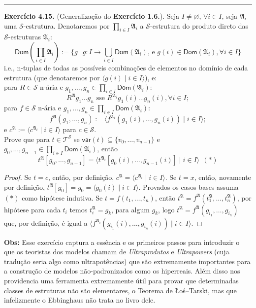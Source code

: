 \documentclass[11pt]{article}
\newcommand{\mc}[1]{\mathcal{#1}}
\newcommand{\mf}[1]{\mathfrak{#1}}
\newcommand{\msf}[1]{\mathsf{#1}}
\begin{document}
\hrule

\begin{shaded}
\textbf{Exercício 4.15.} (Generalização do \textbf{Exercício 1.6.}). Seja $I\ne\varnothing$, $\forall i\in I$, seja $\mf{A}_i$ uma $\mc{S}$-estrutura. Denotaremos por $\prod_{i\in I}\mf{A}_i$ a $\mc{S}$-estrutura do produto direto das $\mc{S}$-estruturas $\mf{A}_i$:
$$\msf{Dom}\left(\prod_{i\in I}\mf{A}_i\right):=\left.\biggl\{g~\right|~ g:I\to\bigcup_{i\in I}\msf{Dom}(\mf{A}_i)\text{, e }g(i)\in\msf{Dom}(\mf{A}_i),\forall i\in I\biggr\}$$
i.e., n-tuplas de todas as possíveis combinações de elementos no domínio de cada estrutura (que denotaremos por $\langle g(i) \mid i \in I\rangle$), e:\\
para $R\in\mc{S}$ n-ária e $g_1,\dots,g_n\in\prod_{i\in I}\msf{Dom}(\mf{A}_i):$
$$R^\mf{A}g_1\dots g_n\text{ sse }R^{\mf{A}_i}g_1(i)\dots g_n(i), \forall i\in I;$$
para $f\in\mc{S}$ n-ária e $g_1,\dots,g_n\in\prod_{i\in I}\msf{Dom}(\mf{A}_i):$
$$f^\mf{A}(g_1,\dots,g_n):=\langle f^{\mf{A}_i}(g_1(i),\dots,g_n(i)) \mid i\in I\rangle;$$
e $c^\mf{A}:=\langle c^{\mf{A}_i}\mid i\in I\rangle$ para $c\in\mc{S}$.\\
Prove que para $t\in\mc{T}^\mc{S}$ se $\msf{var}(t)\subseteq\{v_0,\dots,v_{n-1}\}$ e $g_0,\dots,g_{n-1}\in\prod_{i\in I}\msf{Dom}(\mf{A}_i)$, então
$$t^\mf{A}[g_0,\dots,g_{n-1}]=\langle t^{\mf{A}_i}[g_0(i),\dots,g_{n-1}(i)]\mid i\in I\rangle~~(*)$$
\end{shaded}

\begin{proof}
    Se $t=c$, então, por definição, $c^\mf{A}=\langle c^{\mf{A}_i}\mid i\in I\rangle$. Se $t=x$, então, novamente por definição, $t^\mf{A}[g_0]=g_0=\langle g_0(i)\mid i\in I\rangle$. Provados os casos bases assuma $(*)$ como hipótese indutiva. Se $t=f(t_1,\dots,t_n)$, então $t^\mf{A}=f^\mf{A}(t_1^\mf{A},\dots,t_n^\mf{A})$, por hipótese para cada $t_i$ temos $t_i^\mf{A}=g_k$, para algum $g_k$, logo $t^\mf{A}=f^\mf{A}(g_{i_1},\dots,g_{i_n})$ que, por definição, é igual a $\langle f^{\mf{A}_i}(g_{i_1}(i),\dots,g_{i_n}(i))\mid i\in I\rangle$.
\end{proof}

\textbf{Obs:} Esse exercício captura a essência e os primeiros passos para introduzir o que os teoristas dos modelos chamam de \textit{Ultraprodutos} e \textit{Ultrapowers} (cuja tradução seria algo como ultrapotências) que são extremamente importantes para a construção de modelos não-padronizados como os hiperreais. Além disso nos providencia uma ferramenta extremamente útil para provar que determinadas classes de estruturas não são elementares, o Teorema de Łoś–Tarski, mas que infelizmente o Ebbinghaus não trata no livro dele.\\
\end{document}
